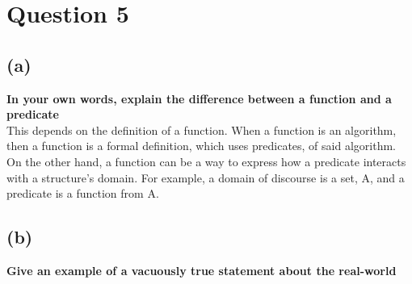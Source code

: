 \documentclass[a4paper]{article}
\begin{document}
\newpage
\section{Question 5}
\subsection{(a)}
\textbf{In your own words, explain the difference between a function and a predicate}\\
This depends on the definition of a function.
When a function is an algorithm, then a function is a formal definition, which uses predicates, of said algorithm.
On the other hand, a function can be a way to express how a predicate interacts with a structure's domain. For example, a domain of discourse is a set, A, and a predicate is a function from A.
\subsection{(b)}
\textbf{Give an example of a vacuously true statement about the real-world}\\
\end{document}
